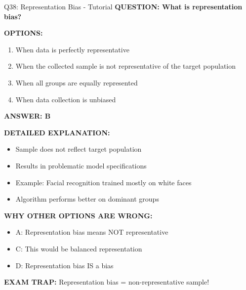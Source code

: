 \documentclass[8pt]{beamer}
\begin{document}
	\begin{frame}{Q38: Representation Bias - Tutorial}
		\fontsize{6.5}{7.5}\selectfont
		\textbf{QUESTION: What is representation bias?}
		
		\vspace{0.1cm}
		\textbf{OPTIONS:}
		\begin{enumerate}
			\item When data is perfectly representative
			\item When the collected sample is not representative of the target population
			\item When all groups are equally represented
			\item When data collection is unbiased
		\end{enumerate}
		
		\vspace{0.1cm}
		\textcolor{myblue}{\textbf{ANSWER: B}}
		
		\vspace{0.1cm}
		\textbf{DETAILED EXPLANATION:}
		\begin{itemize}
			\item Sample does not reflect target population
			\item Results in problematic model specifications
			\item Example: Facial recognition trained mostly on white faces
			\item Algorithm performs better on dominant groups
		\end{itemize}
		
		\vspace{0.1cm}
		\textcolor{myred}{\textbf{WHY OTHER OPTIONS ARE WRONG:}}
		\begin{itemize}
			\item \textcolor{myred}{A:} Representation bias means NOT representative
			\item \textcolor{myred}{C:} This would be balanced representation
			\item \textcolor{myred}{D:} Representation bias IS a bias
		\end{itemize}
		
		\textcolor{myred}{\textbf{EXAM TRAP:}} Representation bias = \textcolor{myblue}{non-representative sample}!
	\end{frame}
	
\end{document}
